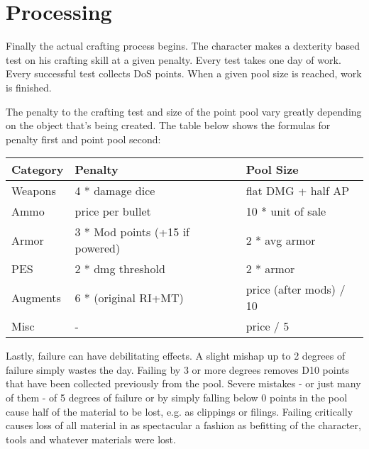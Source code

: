 \documentclass[12pt,a4paper,openany]{book}
\begin{document}
	\chapter{Processing}
	Finally the actual crafting process begins. The character makes a dexterity based test on his crafting skill at a given penalty. Every test takes one day of work. Every successful test collects DoS points. When a given pool size is reached, work is finished.\par
	The penalty to the crafting test and size of the point pool vary greatly depending on the object that’s being created. The table below shows the formulas for penalty first and point pool second:
	\par
	\begin{tabularx}{\columnwidth}{X|ll}
		Category & Penalty & Pool Size \\ \hline
		Weapons & 4 * damage dice & flat DMG + half AP \\
		Ammo & price per bullet & 10 * unit of sale \\
		Armor & 3 * Mod points (+15 if powered) & 2 * avg armor \\
		PES & 2 * dmg threshold & 2 * armor \\
		Augments & 6 * (original RI+MT) & price (after mods) / 10 \\
		Misc & - & price / 5
	\end{tabularx}\par
	Lastly, failure can have debilitating effects. A slight mishap up to 2 degrees of failure simply wastes the day. Failing by 3 or more degrees removes D10 points that have been collected previously from the pool. Severe mistakes - or just many of them - of 5 degrees of failure or by simply falling below 0 points in the pool cause half of the material to be lost, e.g. as clippings or filings. Failing critically causes loss of all material in as spectacular a fashion as befitting of the character, tools and whatever materials were lost.
\end{document}
